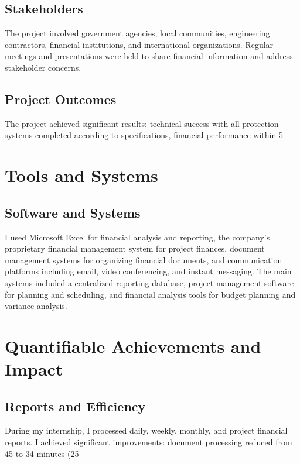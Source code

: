 \subsection{Stakeholders}
The project involved government agencies, local communities, engineering contractors, financial institutions, and international organizations. Regular meetings and presentations were held to share financial information and address stakeholder concerns.

\vspace{0.3em}
\subsection{Project Outcomes}
The project achieved significant results: technical success with all protection systems completed according to specifications, financial performance within 5%

\vspace{0.5em}
\section{Tools and Systems}

\subsection{Software and Systems}
I used Microsoft Excel for financial analysis and reporting, the company's proprietary financial management system for project finances, document management systems for organizing financial documents, and communication platforms including email, video conferencing, and instant messaging. The main systems included a centralized reporting database, project management software for planning and scheduling, and financial analysis tools for budget planning and variance analysis.

\vspace{0.5em}
\section{Quantifiable Achievements and Impact}

\subsection{Reports and Efficiency}
During my internship, I processed daily, weekly, monthly, and project financial reports. I achieved significant improvements: document processing reduced from 45 to 34 minutes (25%

